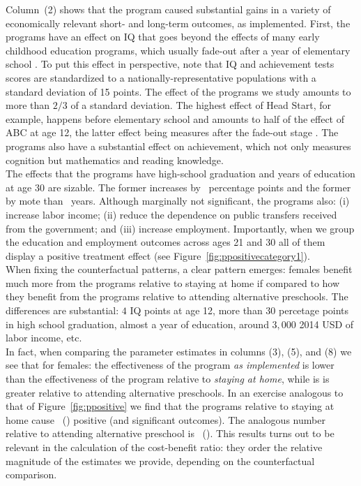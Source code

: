 \noindent Column~(2) shows that the program caused substantial gains in a variety of economically relevant short- and long-term outcomes, as implemented. First, the programs have an effect on IQ that goes beyond the effects of many early childhood education programs, which usually fade-out after a year of elementary school \citep{Hojman_2015_EvidenceFadeOut,Elango_Hojman_etal_2016_Early-Edu}. To put this effect in perspective, note that IQ and achievement tests scores are standardized to a nationally-representative populations with a standard deviation of 15 points. The effect of the programs we study amounts to more than $2/3$ of a standard deviation. The highest effect of Head Start, for example, happens before elementary school and amounts to half of the effect of ABC at age 12, the latter effect being measures after the fade-out stage \citep{Elango_Hojman_etal_2016_Early-Edu}. The programs also have a substantial effect on achievement, which not only measures cognition but mathematics and reading knowledge.\\

\noindent The effects that the programs have high-school graduation and years of education at age 30 are sizable. The former increases by \hsgradf\ percentage points and the former by mote than \yearsedf\ years. Although marginally not significant, the programs also: (i) increase labor income; (ii) reduce the dependence on public transfers received from the government; and (iii) increase employment. Importantly, when we group the education and employment outcomes across ages 21 and 30 all of them display a positive treatment effect (see Figure~\ref{fig:ppositivecategory1}).\\

\noindent When fixing the counterfactual patterns, a clear pattern emerges: females benefit much more from the programs relative to staying at home if compared to how they benefit from the programs relative to attending alternative preschools. The differences are substantial: $4$ IQ points at age 12, more than $30$ percetage points in high school graduation, almost a year of education, around $3,000$ 2014 USD of labor income, etc.\\

\noindent In fact, when comparing the parameter estimates in columns (3), (5), and (8) we see that for females: the effectiveness of the program \textit{as implemented} is lower than the effectiveness of the program relative to \textit{staying at home}, while is is greater relative to attending alternative preschools. In an exercise analogous to that of Figure~\ref{fig:ppositive} we find that the programs relative to staying at home cause \positivecsnf\ (\positivescsnf) positive (and significant outcomes). The analogous number relative to attending alternative preschool is \positivecsaf\ (\positivescsaf). This results turns out to be relevant in the calculation of the cost-benefit ratio: they order the relative magnitude of the estimates we provide, depending on the counterfactual comparison.\\ 

